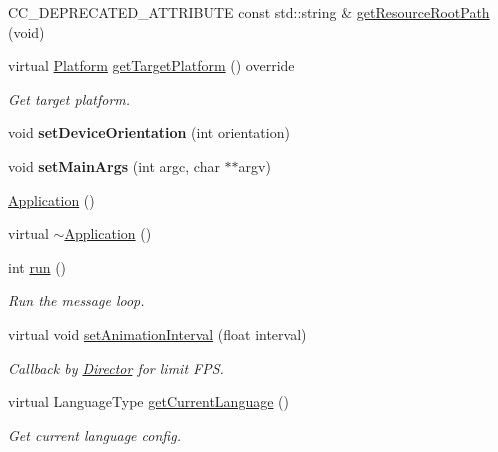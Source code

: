 \begin{DoxyCompactItemize}
\item 
C\+C\+\_\+\+D\+E\+P\+R\+E\+C\+A\+T\+E\+D\+\_\+\+A\+T\+T\+R\+I\+B\+U\+TE const std\+::string \& \hyperlink{classApplication_a669e0584fa243449d87b17bc31d19113}{get\+Resource\+Root\+Path} (void)
\item 
\mbox{\label{classApplication_ab28ac2b31e12cd16e157eeee710ef4a4}} 
virtual \hyperlink{classApplicationProtocol_aff3819b9b879107dc9c207d0e7ae36d1}{Platform} \hyperlink{classApplication_ab28ac2b31e12cd16e157eeee710ef4a4}{get\+Target\+Platform} () override
\begin{DoxyCompactList}\small\item\em Get target platform. \end{DoxyCompactList}\item 
\mbox{\label{classApplication_a8433f92ecbd4ba87bf753f3b7487ae18}} 
void {\bfseries set\+Device\+Orientation} (int orientation)
\item 
\mbox{\label{classApplication_a64ab642f1acaceb7729cc06bf491cdb4}} 
void {\bfseries set\+Main\+Args} (int argc, char $\ast$$\ast$argv)
\item 
\hyperlink{classApplication_afa8cc05ce6b6092be5ecdfdae44e05f8}{Application} ()
\item 
virtual \hyperlink{classApplication_a20573928a0d53fb96d929513bc5acde6}{$\sim$\+Application} ()
\item 
\mbox{\label{classApplication_a8cf8941c8db90117d3735bce5ae1fdf4}} 
int \hyperlink{classApplication_a8cf8941c8db90117d3735bce5ae1fdf4}{run} ()
\begin{DoxyCompactList}\small\item\em Run the message loop. \end{DoxyCompactList}\item 
virtual void \hyperlink{classApplication_a1b5b44a0013466855dce330a517885c3}{set\+Animation\+Interval} (float interval)
\begin{DoxyCompactList}\small\item\em Callback by \hyperlink{classDirector}{Director} for limit F\+PS. \end{DoxyCompactList}\item 
virtual Language\+Type \hyperlink{classApplication_a3fd3aeff0465fffe782af5b1441131c6}{get\+Current\+Language} ()
\begin{DoxyCompactList}\small\item\em Get current language config. \end{DoxyCompactList}\item 
$$
\end{DoxyCompactItemize}
